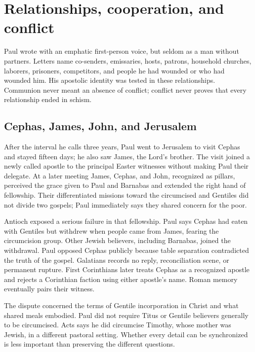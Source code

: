 \section{Relationships, cooperation, and conflict}\label{sec:paul-relations}

Paul wrote with an emphatic first-person voice, but seldom as a man without
partners. Letters name co-senders, emissaries, hosts, patrons, household
churches, laborers, prisoners, competitors, and people he had wounded or who
had wounded him. His apostolic identity was tested in these relationships.
Communion never meant an absence of conflict; conflict never proves that every
relationship ended in schism.

\subsection{Cephas, James, John, and Jerusalem}

After the interval he calls three years, Paul went to Jerusalem to visit
Cephas and stayed fifteen days; he also saw James, the Lord's brother. The
visit joined a newly called apostle to the principal Easter witnesses without
making Paul their delegate. At a later meeting James, Cephas, and John,
recognized as pillars, perceived the grace given to Paul and Barnabas and
extended the right hand of fellowship. Their differentiated missions toward
the circumcised and Gentiles did not divide two gospels; Paul immediately says
they shared concern for the poor.

Antioch exposed a serious failure in that fellowship. Paul says Cephas had
eaten with Gentiles but withdrew when people came from James, fearing the
circumcision group. Other Jewish believers, including Barnabas, joined the
withdrawal. Paul opposed Cephas publicly because table separation contradicted
the truth of the gospel. Galatians records no reply, reconciliation scene, or
permanent rupture. First Corinthians later treats Cephas as a recognized
apostle and rejects a Corinthian faction using either apostle's name. Roman
memory eventually pairs their witness.

The dispute concerned the terms of Gentile incorporation in Christ and what
shared meals embodied. Paul did not require Titus or Gentile believers
generally to be circumcised. Acts says he did circumcise Timothy, whose mother
was Jewish, in a different pastoral setting. Whether every detail can be
synchronized is less important than preserving the different questions.

